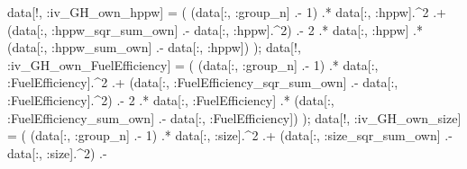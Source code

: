 \documentclass[
  letterpaper,
  DIV=11,
  numbers=noendperiod]{scrreprt}
\newenvironment{Shaded}{\begin{snugshade}}{\end{snugshade}}
\newcommand{\FloatTok}[1]{\textcolor[rgb]{0.68,0.00,0.00}{#1}}
\newcommand{\NormalTok}[1]{\textcolor[rgb]{0.00,0.23,0.31}{#1}}
\newcommand{\OperatorTok}[1]{\textcolor[rgb]{0.37,0.37,0.37}{#1}}
\begin{document}
\begin{Shaded}
\begin{Highlighting}[]
\NormalTok{data[!, }\OperatorTok{:}\NormalTok{iv\_GH\_own\_hppw]             }\OperatorTok{=}\NormalTok{ (}
\NormalTok{    (data[}\OperatorTok{:}\NormalTok{, }\OperatorTok{:}\NormalTok{group\_n] }\OperatorTok{.{-}} \FloatTok{1}\NormalTok{) }\OperatorTok{.*}\NormalTok{ data[}\OperatorTok{:}\NormalTok{, }\OperatorTok{:}\NormalTok{hppw]}\OperatorTok{.\^{}}\FloatTok{2} \OperatorTok{.+} 
\NormalTok{    (data[}\OperatorTok{:}\NormalTok{, }\OperatorTok{:}\NormalTok{hppw\_sqr\_sum\_own] }\OperatorTok{.{-}}\NormalTok{ data[}\OperatorTok{:}\NormalTok{, }\OperatorTok{:}\NormalTok{hppw]}\OperatorTok{.\^{}}\FloatTok{2}\NormalTok{) }\OperatorTok{.{-}} 
    \FloatTok{2} \OperatorTok{.*}\NormalTok{ data[}\OperatorTok{:}\NormalTok{, }\OperatorTok{:}\NormalTok{hppw] }\OperatorTok{.*}\NormalTok{ (data[}\OperatorTok{:}\NormalTok{, }\OperatorTok{:}\NormalTok{hppw\_sum\_own] }\OperatorTok{.{-}}\NormalTok{ data[}\OperatorTok{:}\NormalTok{, }\OperatorTok{:}\NormalTok{hppw])}
\NormalTok{);}
\NormalTok{data[!, }\OperatorTok{:}\NormalTok{iv\_GH\_own\_FuelEfficiency]   }\OperatorTok{=}\NormalTok{ (}
\NormalTok{    (data[}\OperatorTok{:}\NormalTok{, }\OperatorTok{:}\NormalTok{group\_n] }\OperatorTok{.{-}} \FloatTok{1}\NormalTok{) }\OperatorTok{.*}\NormalTok{ data[}\OperatorTok{:}\NormalTok{, }\OperatorTok{:}\NormalTok{FuelEfficiency]}\OperatorTok{.\^{}}\FloatTok{2} \OperatorTok{.+} 
\NormalTok{    (data[}\OperatorTok{:}\NormalTok{, }\OperatorTok{:}\NormalTok{FuelEfficiency\_sqr\_sum\_own] }\OperatorTok{.{-}}\NormalTok{ data[}\OperatorTok{:}\NormalTok{, }\OperatorTok{:}\NormalTok{FuelEfficiency]}\OperatorTok{.\^{}}\FloatTok{2}\NormalTok{) }\OperatorTok{.{-}} 
    \FloatTok{2} \OperatorTok{.*}\NormalTok{ data[}\OperatorTok{:}\NormalTok{, }\OperatorTok{:}\NormalTok{FuelEfficiency] }\OperatorTok{.*}\NormalTok{ (data[}\OperatorTok{:}\NormalTok{, }\OperatorTok{:}\NormalTok{FuelEfficiency\_sum\_own] }\OperatorTok{.{-}}\NormalTok{ data[}\OperatorTok{:}\NormalTok{, }\OperatorTok{:}\NormalTok{FuelEfficiency])}
\NormalTok{);}
\NormalTok{data[!, }\OperatorTok{:}\NormalTok{iv\_GH\_own\_size]             }\OperatorTok{=}\NormalTok{ (}
\NormalTok{    (data[}\OperatorTok{:}\NormalTok{, }\OperatorTok{:}\NormalTok{group\_n] }\OperatorTok{.{-}} \FloatTok{1}\NormalTok{) }\OperatorTok{.*}\NormalTok{ data[}\OperatorTok{:}\NormalTok{, }\OperatorTok{:}\NormalTok{size]}\OperatorTok{.\^{}}\FloatTok{2} \OperatorTok{.+} 
\NormalTok{    (data[}\OperatorTok{:}\NormalTok{, }\OperatorTok{:}\NormalTok{size\_sqr\_sum\_own] }\OperatorTok{.{-}}\NormalTok{ data[}\OperatorTok{:}\NormalTok{, }\OperatorTok{:}\NormalTok{size]}\OperatorTok{.\^{}}\FloatTok{2}\NormalTok{) }\OperatorTok{.{-}} 

\end{Highlighting}
\end{Shaded}
\end{document}
